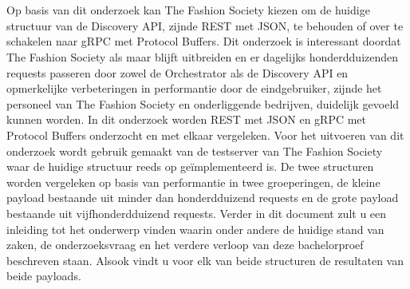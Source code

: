 
%
%

%



\chapter*{}

Op basis van dit onderzoek kan The Fashion Society kiezen om de huidige structuur van de Discovery API, zijnde REST met JSON, te behouden of over te schakelen naar gRPC met Protocol Buffers. Dit onderzoek is interessant doordat The Fashion Society als maar blijft uitbreiden en er dagelijks honderdduizenden requests passeren door zowel de Orchestrator als de Discovery API en opmerkelijke verbeteringen in performantie door de eindgebruiker, zijnde het personeel van The Fashion Society en onderliggende bedrijven, duidelijk gevoeld kunnen worden. In dit onderzoek worden REST met JSON en gRPC met Protocol Buffers onderzocht en met elkaar vergeleken. Voor het uitvoeren van dit onderzoek wordt gebruik gemaakt van de testserver van The Fashion Society waar de huidige structuur reeds op geïmplementeerd is. De twee structuren worden vergeleken op basis van performantie in twee groeperingen, de kleine payload bestaande uit minder dan honderdduizend requests en de grote payload bestaande uit vijfhonderdduizend requests. Verder in dit document zult u een inleiding tot het onderwerp vinden waarin onder andere de huidige stand van zaken, de onderzoeksvraag en het verdere verloop van deze bachelorproef beschreven staan. Alsook vindt u voor elk van beide structuren de resultaten van beide payloads.
